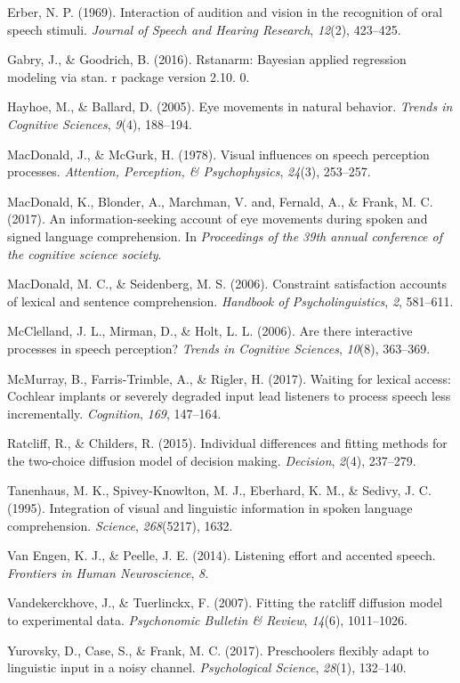 \documentclass[10pt, letterpaper]{article}
\begin{document}
\hypertarget{ref-erber1969interaction}{}
Erber, N. P. (1969). Interaction of audition and vision in the
recognition of oral speech stimuli. \emph{Journal of Speech and Hearing
Research}, \emph{12}(2), 423--425.

\hypertarget{ref-gabry2016rstanarm}{}
Gabry, J., \& Goodrich, B. (2016). Rstanarm: Bayesian applied regression
modeling via stan. r package version 2.10. 0.

\hypertarget{ref-hayhoe2005eye}{}
Hayhoe, M., \& Ballard, D. (2005). Eye movements in natural behavior.
\emph{Trends in Cognitive Sciences}, \emph{9}(4), 188--194.

\hypertarget{ref-macdonald1978visual}{}
MacDonald, J., \& McGurk, H. (1978). Visual influences on speech
perception processes. \emph{Attention, Perception, \& Psychophysics},
\emph{24}(3), 253--257.

\hypertarget{ref-macdonald2017info}{}
MacDonald, K., Blonder, A., Marchman, V. and, Fernald, A., \& Frank, M.
C. (2017). An information-seeking account of eye movements during spoken
and signed language comprehension. In \emph{Proceedings of the 39th
annual conference of the cognitive science society}.

\hypertarget{ref-macdonald2006constraint}{}
MacDonald, M. C., \& Seidenberg, M. S. (2006). Constraint satisfaction
accounts of lexical and sentence comprehension. \emph{Handbook of
Psycholinguistics}, \emph{2}, 581--611.

\hypertarget{ref-mcclelland2006there}{}
McClelland, J. L., Mirman, D., \& Holt, L. L. (2006). Are there
interactive processes in speech perception? \emph{Trends in Cognitive
Sciences}, \emph{10}(8), 363--369.

\hypertarget{ref-mcmurray2017waiting}{}
McMurray, B., Farris-Trimble, A., \& Rigler, H. (2017). Waiting for
lexical access: Cochlear implants or severely degraded input lead
listeners to process speech less incrementally. \emph{Cognition},
\emph{169}, 147--164.

\hypertarget{ref-ratcliff2015individual}{}
Ratcliff, R., \& Childers, R. (2015). Individual differences and fitting
methods for the two-choice diffusion model of decision making.
\emph{Decision}, \emph{2}(4), 237--279.

\hypertarget{ref-tanenhaus1995integration}{}
Tanenhaus, M. K., Spivey-Knowlton, M. J., Eberhard, K. M., \& Sedivy, J.
C. (1995). Integration of visual and linguistic information in spoken
language comprehension. \emph{Science}, \emph{268}(5217), 1632.

\hypertarget{ref-van2014listening}{}
Van Engen, K. J., \& Peelle, J. E. (2014). Listening effort and accented
speech. \emph{Frontiers in Human Neuroscience}, \emph{8}.

\hypertarget{ref-vandekerckhove2007fitting}{}
Vandekerckhove, J., \& Tuerlinckx, F. (2007). Fitting the ratcliff
diffusion model to experimental data. \emph{Psychonomic Bulletin \&
Review}, \emph{14}(6), 1011--1026.

\hypertarget{ref-yurovsky2017preschoolers}{}
Yurovsky, D., Case, S., \& Frank, M. C. (2017). Preschoolers flexibly
adapt to linguistic input in a noisy channel. \emph{Psychological
Science}, \emph{28}(1), 132--140.
\end{document}
